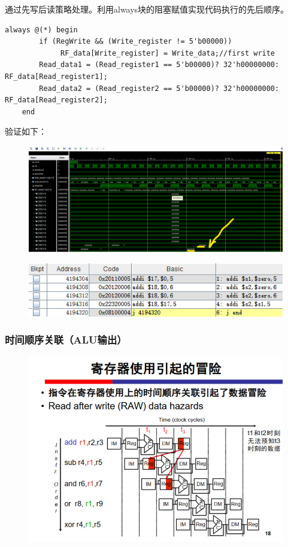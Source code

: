 \documentclass[10pt]{article}
\begin{document}
通过先写后读策略处理。利用always块的阻塞赋值实现代码执行的先后顺序。
\begin{lstlisting}[style={verilog-style}]
    always @(*) begin
        if (RegWrite && (Write_register != 5'b00000))
             RF_data[Write_register] = Write_data;//first write
        Read_data1 = (Read_register1 == 5'b00000)? 32'h00000000: RF_data[Read_register1];
        Read_data2 = (Read_register2 == 5'b00000)? 32'h00000000: RF_data[Read_register2];
    end
\end{lstlisting}
验证如下：
\begin{figure}[H]
    \centering
    \includegraphics[scale=0.43]{fwtr.png}
    \end{figure}
    \begin{figure}[H]
        \centering
        \includegraphics[scale=0.9]{fwtrx.png}
        \end{figure}
\subsubsection{时间顺序关联（ALU输出）}
\begin{figure}[H]
    \centering
    \includegraphics[scale=0.3]{reg.png}
    \end{figure}
\end{document}
